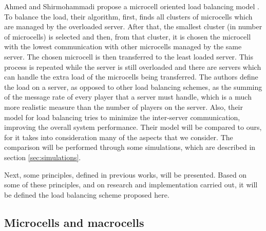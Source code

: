 Ahmed and Shirmohammadi propose a microcell oriented load balancing model \cite{ahmed2008mol}. To balance the load, their algorithm, first, finds all clusters of microcells which are managed by the overloaded server. After that, the smallest cluster (in number of microcells) is selected and then, from that cluster, it is chosen the microcell with the lowest communication with other microcells managed by the same server. The chosen microcell is then transferred to the least loaded server. This process is repeated while the server is still overloaded and there are servers which can handle the extra load of the microcells being transferred. The authors define the load on a server, as opposed to other load balancing schemes, as the summing of the message rate of every player that a server must handle, which is a much more realistic measure than the number of players on the server. Also, their model for load balancing tries to minimize the inter-server communication, improving the overall system performance. Their model will be compared to ours, for it takes into consideration many of the aspects that we consider. The comparison will be performed through some simulations, which are described in section \ref{sec:simulations}.

Next, some principles, defined in previous works, will be presented. Based on some of these principles, and on research and implementation carried out, it will be defined the load balancing scheme proposed here.

\subsection{Microcells and macrocells}
\label{sec:micro}


